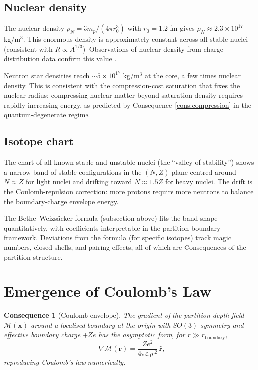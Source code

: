 \documentclass[11pt,twocolumn,a4paper]{article}
\theoremstyle{axiomstyle}
\theoremstyle{conseqstyle}
\newtheorem{consequence}{Consequence}
\theoremstyle{definition}
\theoremstyle{remark}
\newcommand{\Depth}{\mathcal{M}}
\begin{document}
\subsection{Nuclear density}

The nuclear density $\rho_{N}=3m_{p}/(4\pi r_{0}^{3})$ with $r_{0}=1.2$ fm gives $\rho_{N}\approx 2.3\times 10^{17}$ kg/m$^{3}$. This enormous density is approximately constant across all stable nuclei (consistent with $R\propto A^{1/3}$). Observations of nuclear density from charge distribution data confirm this value \citep{hofstadter1956}.

Neutron star densities reach $\sim 5\times 10^{17}$ kg/m$^{3}$ at the core, a few times nuclear density. This is consistent with the compression-cost saturation that fixes the nuclear radius: compressing nuclear matter beyond saturation density requires rapidly increasing energy, as predicted by Consequence~\ref{cons:compression} in the quantum-degenerate regime.

\subsection{Isotope chart}

The chart of all known stable and unstable nuclei (the ``valley of stability'') shows a narrow band of stable configurations in the $(N,Z)$ plane centred around $N\approx Z$ for light nuclei and drifting toward $N\approx 1.5Z$ for heavy nuclei. The drift is the Coulomb-repulsion correction: more protons require more neutrons to balance the boundary-charge envelope energy.

The Bethe--Weizs\"acker formula (subsection above) fits the band shape quantitatively, with coefficients interpretable in the partition-boundary framework. Deviations from the formula (for specific isotopes) track magic numbers, closed shells, and pairing effects, all of which are Consequences of the partition structure.

\section{Emergence of Coulomb's Law}
\label{sec:coulombenvelope}

\begin{consequence}[Coulomb envelope]
\label{cons:coulombenvelope}
The gradient of the partition depth field $\Depth(\mathbf{x})$ around a localised boundary at the origin with $SO(3)$ symmetry and effective boundary charge $+Ze$ has the asymptotic form, for $r\gg r_{\text{boundary}}$,
\begin{equation}
-\nabla\Depth(\mathbf{r})=\frac{Ze^{2}}{4\pi\varepsilon_{0}r^{2}}\,\hat{\mathbf{r}},
\label{eq:coulombenvelope}
\end{equation}
reproducing Coulomb's law numerically.
\end{consequence}
\end{document}
